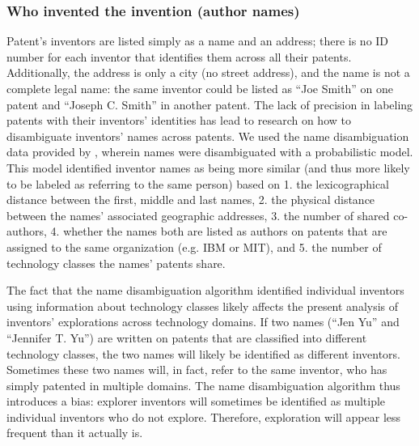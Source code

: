 \documentclass{dsj}
\begin{document}
\subsubsection*{Who invented the invention (author names)}
Patent's inventors are listed simply as a name and an address; there is no ID number for each inventor that identifies them across all their patents. Additionally, the address is only a city (no street address), and the name is not a complete legal name: the same inventor could be listed as ``Joe Smith'' on one patent and ``Joseph C. Smith'' in another patent. The lack of precision in labeling patents with their inventors' identities has lead to research on how to disambiguate inventors' names across patents. We used the name disambiguation data provided by \cite{Li2014}, wherein names were disambiguated with a probabilistic model. This model identified inventor names as being more similar (and thus more likely to be labeled as referring to the same person) based on 1. the lexicographical distance between the first, middle and last names, 2. the physical distance between the names' associated geographic addresses, 3. the number of shared co-authors, 4. whether the names both are listed as authors on patents that are assigned to the same organization (e.g. IBM or MIT), and 5. the number of technology classes the names' patents share.

The fact that the name disambiguation algorithm identified individual inventors using information about technology classes likely affects the present analysis of inventors' explorations across technology domains. If two names (``Jen Yu'' and ``Jennifer T. Yu'') are written on patents that are classified into different technology classes, the two names will likely be identified as different inventors. Sometimes these two names will, in fact, refer to the same inventor, who has simply patented in multiple domains. The name disambiguation algorithm thus introduces a bias: explorer inventors will sometimes be identified as multiple individual inventors who do not explore. Therefore, exploration will appear less frequent than it actually is. 
\end{document}

